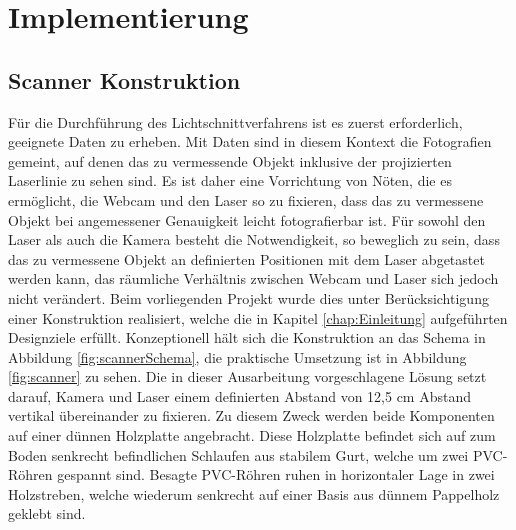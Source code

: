 \chapter{Implementierung}
\label{chap:Implementierung}

\section{Scanner Konstruktion}
\label{sec:scannerKonstruktion}
Für die Durchführung des Lichtschnittverfahrens ist es zuerst erforderlich, geeignete Daten zu erheben. Mit Daten sind in diesem Kontext die Fotografien gemeint, auf denen das zu vermessende Objekt inklusive der projizierten Laserlinie zu sehen sind. Es ist daher eine Vorrichtung von Nöten, die es ermöglicht, die Webcam und den Laser so zu fixieren, dass das zu vermessene Objekt bei angemessener Genauigkeit leicht fotografierbar ist. Für sowohl den Laser als auch die Kamera besteht die Notwendigkeit, so beweglich zu sein, dass das zu vermessene Objekt an definierten Positionen mit dem Laser abgetastet werden kann, das räumliche Verhältnis zwischen Webcam und Laser sich jedoch nicht verändert. Beim vorliegenden Projekt wurde dies unter Berücksichtigung einer Konstruktion realisiert, welche die in Kapitel \ref{chap:Einleitung} aufgeführten Designziele erfüllt. Konzeptionell hält sich die Konstruktion an das Schema in Abbildung \ref{fig:scannerSchema}, die praktische Umsetzung ist in Abbildung \ref{fig:scanner} zu sehen. Die in dieser Ausarbeitung vorgeschlagene Lösung setzt darauf, Kamera und Laser einem definierten Abstand von 12,5 cm Abstand vertikal übereinander zu fixieren. Zu diesem Zweck werden beide Komponenten auf einer dünnen Holzplatte angebracht. Diese Holzplatte befindet sich auf zum Boden senkrecht befindlichen Schlaufen aus stabilem Gurt, welche um zwei PVC-Röhren gespannt sind. Besagte PVC-Röhren ruhen in horizontaler Lage in zwei Holzstreben, welche wiederum senkrecht auf einer Basis aus dünnem Pappelholz geklebt sind. 

